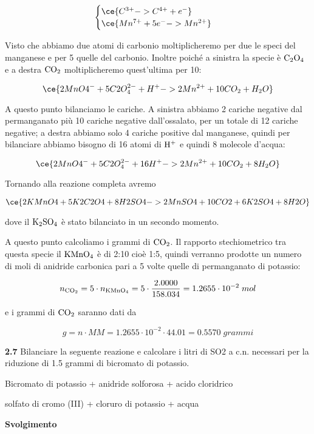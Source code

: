 $$\begin{cases}
    \ce{C^{3+} -> C^{4+} + e^-}\\
    \ce{Mn^{7+} + 5e^- -> Mn^{2+}}
\end{cases}$$

Visto che abbiamo due atomi di carbonio moltiplicheremo per due le speci del manganese e per 5 quelle del carbonio. Inoltre poiché a sinistra la specie è $\rm C_2O_4$ e a destra $\rm CO_2$ moltiplicheremo quest'ultima per 10:

$$\ce{2MnO4^- + 5C2O_4^{2-} + H^+ -> 2Mn^{2+} + 10CO_2 + H_2O}$$

A questo punto bilanciamo le cariche. A sinistra abbiamo 2 cariche negative dal permanganato più 10 cariche negative dall'ossalato, per un totale di 12 cariche negative; a destra abbiamo solo 4 cariche positive dal manganese, quindi per bilanciare abbiamo bisogno di 16 atomi di $\rm H^+$ e quindi 8 molecole d'acqua:

$$\ce{2MnO4^- + 5C2O_4^{2-} + 16H^+ -> 2Mn^{2+} + 10CO_2 + 8H_2O}$$

Tornando alla reazione completa avremo

$$\ce{2KMnO4 + 5K2C2O4 + 8H2SO4 -> 2MnSO4 + 10CO2 + 6K2SO4 + 8H2O}$$

dove il $\rm K_2SO_4$ è stato bilanciato in un secondo momento.

A questo punto calcoliamo i grammi di $\rm CO_2$. Il rapporto stechiometrico tra questa specie il $\rm KMnO_4$ è di 2:10 cioè 1:5, quindi verranno prodotte un numero di moli di anidride carbonica pari a 5 volte quelle di permanganato di potassio:

$$n_{\rm CO_2}=5 \cdot n_{\rm KMnO_4}
=5 \cdot \frac{2.0000}{158.034}
=1.2655 \cdot 10^{-2}\;mol$$

e i grammi di $\rm CO_2$ saranno dati da

$$g=n \cdot MM=1.2655 \cdot 10^{-2} \cdot 44.01
=0.5570\;grammi$$

\vspace{0.2cm}\textbf{2.7} Bilanciare la seguente reazione e calcolare i litri di SO2 a c.n. necessari per la riduzione di 1.5
grammi di bicromato di potassio.

\begin{center}
    Bicromato di potassio + anidride solforosa + acido cloridrico \ce{->}

    \ce{->} solfato di cromo (III) + cloruro di potassio + acqua
\end{center}

\large\textbf{Svolgimento}\normalsize

